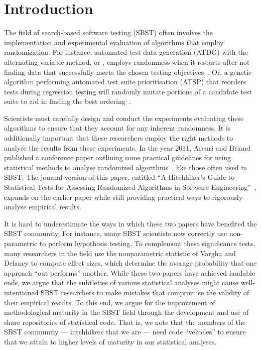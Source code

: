 
\section{Introduction}
\label{sec:introduction}

The field of search-based software testing (SBST) often involves the implementation and experimental evaluation of
algorithms that employ randomization. For instance, automated test data generation (ATDG) with the alternating variable
method, or \AVM, employs randomness when it restarts after not finding data that successfully meets the chosen
testing objectives~\cite{McMinn2015}. Or, a genetic algorithm performing automated test suite prioritisation (ATSP) that
reorders tests during regression testing will randomly mutate portions of a candidate test suite to aid in
finding the best ordering~\cite{Walcott2006}.

Scientists must carefully design and conduct the experiments evaluating these algorithms to ensure that they account for
any inherent randomness. It is additionally important that these researchers employ the right methods to analyse the results
from these experiments. In the year 2011, Arcuri and Briand published a conference paper outlining some practical
guidelines for using statistical methods to analyse randomized algorithms~\cite{Arcuri2011}, like those often used in
SBST. The journal version of this paper, entitled ``A Hitchhiker's Guide to Statistical Tests for
Assessing Randomized Algorithms in Software Engineering''~\cite{Arcuri2014}, expands on the earlier paper while still
providing practical ways to rigorously analyse empirical results.

It is hard to underestimate the ways in which these two papers have benefited the SBST community. For instance, many
SBST scientists now correctly use non-parametric \wilcoxon to perform hypothesis testing. To complement these
significance tests, many researchers in the field use the nonparametric \atwelve statistic of Vargha and Delaney
\cite{Vargha2000} to compute effect sizes, which determine the average probability that one approach ``out performs''
another. While these two papers have achieved laudable ends, we argue that the subtleties of various statistical
analyses might cause well-intentioned SBST researchers to make mistakes that compromise the validity of their empirical
results. To this end, we argue for the improvement of methodological maturity in the SBST field through the development
and use of share repositories of statistical code. That is, we note that the members of the SBST community ---
hitchhikers that we are --- need code ``vehicles'' to ensure that we attain to higher levels of maturity in our
statistical analyses.

